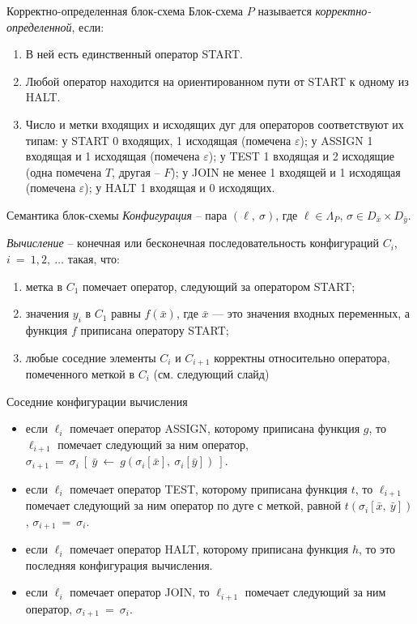 \documentclass{beamer}
\begin{document}
	\begin{frame}{Корректно-определенная блок-схема}
	Блок-схема $P$ называется \emph{корректно-определенной}, если:
		\begin{enumerate}
		\item В ней есть единственный оператор START.
		\item Любой оператор находится на ориентированном пути от START к одному из HALT.
		\item Число и метки входящих и исходящих дуг для операторов соответствуют их типам: у START 0 входящих, 1 исходящая (помечена $\varepsilon$); у ASSIGN 1 входящая и 1 исходящая (помечена $\varepsilon$); у TEST 1 входящая и 2 исходящие (одна помечена $T$, другая -- $F$); у JOIN не менее 1 входящей и 1 исходящая (помечена $\varepsilon$); у HALT 1 входящая и 0 исходящих.
		\end{enumerate}
	\end{frame}

	\begin{frame}{Семантика блок-схемы}
	\emph{Конфигурация} -- пара $(\ell,~\sigma)$, где $\ell \in \Lambda_P$, $\sigma \in D_{\bar{x}} \times D_{\bar{y}}$.

	\emph{Вычисление} -- конечная или бесконечная последовательность конфигураций $C_i$, $i~=~1,2,~\ldots$ такая, что:
		\begin{enumerate}
		\item метка в $C_1$ помечает оператор, следующий за оператором START;
		\item значения $y_i$ в $C_1$ равны $f(\bar{x})$, где $\bar{x}$ --- это значения входных переменных, а функция $f$ приписана оператору START;
		\item любые соседние элементы $C_i$ и $C_{i+1}$ корректны относительно оператора, помеченного меткой в $C_i$ (см. следующий слайд)
        \end{enumerate}
    \end{frame}

    \begin{frame}{Соседние конфигурации вычисления}
    \begin{itemize}
    \item если $\ell_i$ помечает оператор ASSIGN, которому приписана функция $g$, то $\ell_{i+1}$ помечает следующий за ним оператор, $\sigma_{i+1}~=~\sigma_i~[~\bar{y}~\leftarrow~g(\sigma_i[\bar{x}],~\sigma_i[\bar{y}])~]$.
    \item если $\ell_i$ помечает оператор TEST, которому приписана функция $t$, то $\ell_{i+1}$ помечает следующий за ним оператор по дуге с меткой, равной $t(\sigma_i[\bar{x},~\bar{y}])$, $\sigma_{i+1}~=~\sigma_i$.
    \item если $\ell_i$ помечает оператор HALT, которому приписана функция $h$, то это последняя конфигурация вычисления.
    \item если $\ell_i$ помечает оператор JOIN, то $\ell_{i+1}$ помечает следующий за ним оператор, $\sigma_{i+1}~=~\sigma_i$.
    \end{itemize}
    \end{frame}
\end{document}
